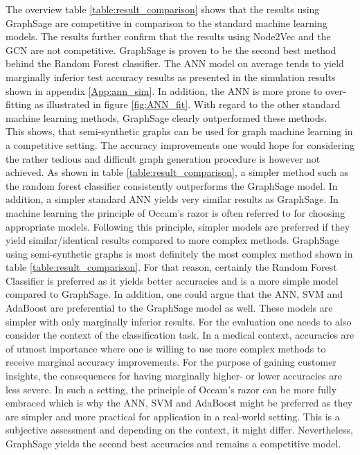   The overview table \ref{table:result_comparison} shows that the results using 
  GraphSage are competitive in comparison to the standard machine learning
  models. The results further confirm that the results using Node2Vec and the 
  GCN are not competitive. GraphSage is proven to be the second best method 
  behind the Random Forest classifier. The ANN model on average tends to yield 
  marginally inferior test accuracy results as presented in the simulation results 
  shown in appendix \ref{App:ann_sim}. In addition, the ANN is more prone to 
  over-fitting as illustrated in figure \ref{fig:ANN_fit}. With regard to the other 
  standard machine learning methods, GraphSage clearly outperformed these methods. \\

  \noindent This shows, that semi-synthetic graphs can be used for graph 
  machine learning in a competitive setting. The accuracy improvements one would 
  hope for considering the rather tedious and difficult graph generation 
  procedure is however not achieved. As shown in table 
  \ref{table:result_comparison}, a simpler method such as the random forest 
  classifier consistently outperforms the GraphSage model. In addition, a
  simpler standard ANN yields very similar results as GraphSage. In machine 
  learning the principle of Occam's razor is often referred to for choosing 
  appropriate models. Following this principle, simpler models are preferred if 
  they yield similar/identical results compared to more complex methods.
  GraphSage using semi-synthetic graphs is most definitely the most complex 
  method shown in table \ref{table:result_comparison}. For that reason, certainly 
  the Random Forest Classifier is preferred as it yields better accuracies and
  is a more simple model compared to GraphSage. In addition, one could argue
  that the ANN, SVM and AdaBoost are preferential to the GraphSage model as
  well. These models are simpler with only marginally inferior results. For
  the evaluation one needs to also consider the context of the classification
  task. In a medical context, accuracies are of utmost importance where one is
  willing to use more complex methods to receive marginal accuracy improvements. 
  For the purpose of gaining customer insights, the consequences for having
  marginally higher- or lower accuracies are less severe. In such a setting,
  the principle of Occam's razor can be more fully embraced which is why the
  ANN, SVM and AdaBoost might be preferred as they are simpler and more
  practical for application in a real-world setting. This is a subjective 
  assessment and depending on the context, it might differ. Nevertheless, 
  GraphSage yields the second best accuracies and remains a competitive model.  





